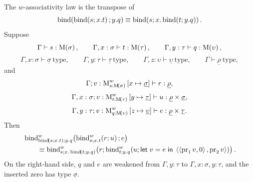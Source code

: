 \documentclass[11pt,a4paper]{article}
\theoremstyle{definition}
\theoremstyle{remark}
\providecommand{\letst}[3]{\mathsf{let}\;#1=#2\;\mathsf{in}\;#3}
\providecommand{\lintype}[1]{\underline{#1}}
\begin{document}
The \(w\)-associativity law is the transpose of
\[
  \fn[n]{\opn[b]{bind}}{
    \fn[n]{\opn[b]{bind}}{s;x.t};
    y.q
  }
  \equiv
  \fn[n]{\opn[b]{bind}}{
    s;
    x.\fn[n]{\opn[b]{bind}}{t;y.q}
  }.
\]
Suppose
\[
  \Gamma\vdash s:\Fun[nn]{\opn[b]{M}}{\sigma},
  \qquad
  \Gamma,x:\sigma\vdash t:\Fun[nn]{\opn[b]{M}}{\tau},
  \qquad
  \Gamma,y:\tau\vdash q:\Fun[nn]{\opn[b]{M}}{\upsilon},
\]
\[
  \Gamma,x:\sigma\vdash \lintype{\sigma}\ \mathrm{type},
  \qquad
  \Gamma,y:\tau\vdash \lintype{\tau}\ \mathrm{type},
  \qquad
  \Gamma,z:\upsilon\vdash \lintype{\upsilon}\ \mathrm{type},
  \qquad
  \Gamma\vdash \lintype{\rho}\ \mathrm{type},
\]
and
\[
  \Gamma;
  v:\opn[b]{M}^{w}_{s:\Fun[nn]{\opn[b]{M}}{\sigma}}
    \left[x\mapsto\lintype{\sigma}\right]
  \vdash r:\lintype{\rho},
\]
\[
  \Gamma,x:\sigma;
  v:\opn[b]{M}^{w}_{t:\Fun[nn]{\opn[b]{M}}{\tau}}
    \left[y\mapsto\lintype{\tau}\right]
  \vdash u:\lintype{\rho}\times\lintype{\sigma},
\]
\[
  \Gamma,y:\tau;
  v:\opn[b]{M}^{w}_{q:\Fun[nn]{\opn[b]{M}}{\upsilon}}
    \left[z\mapsto\lintype{\upsilon}\right]
  \vdash e:\lintype{\rho}\times\lintype{\tau}.
\]
Then
\begin{equation}
  \label{eq:appendix-target-language-monad-w-associativity}
  \begin{aligned}
    &
    \fn[n]{
      \opn[b]{bind}^{w}_{
        \fn[n]{\opn[b]{bind}}{s;x.t};
        y.q
      }
    }{
      \fn[n]{\opn[b]{bind}^{w}_{s;x.t}}{r;u};
      e
    }
    \\
    &\qquad\equiv
    \fn[n]{
      \opn[b]{bind}^{w}_{
        s;
        x.\fn[n]{\opn[b]{bind}}{t;y.q}
      }
    }{
      r;
      \fn[n]{\opn[b]{bind}^{w}_{t;y.q}}{
        u;
        \letst{v}{e}{
          \tuple{
            \tuple{\opn[b]{pr}_{1}v,\opn[b]{0}},
            \opn[b]{pr}_{2}v
          }
        }
      }
    } .
  \end{aligned}
\end{equation}
On the right-hand side, \(q\) and \(e\) are weakened from
\(\Gamma,y:\tau\) to \(\Gamma,x:\sigma,y:\tau\), and the inserted zero has
type \(\lintype{\sigma}\).
\end{document}
